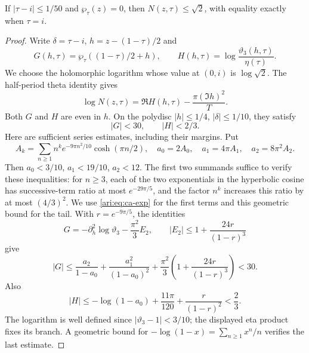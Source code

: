 \begin{proposition}\label{ari:C.8.2}
If $|\tau-i|\le1/50$ and $\wp_\tau(z)=0$, then
$N(z,\tau)\le\sqrt2$, with equality exactly when $\tau=i$.
\end{proposition}
\begin{proof}
Write $\delta=\tau-i$, $h=z-(1-\tau)/2$ and
\[
 G(h,\tau)=\wp_\tau((1-\tau)/2+h),\qquad
 H(h,\tau)=\log\frac{\vartheta_3(h,\tau)}{\eta(\tau)}.
\]
We choose the holomorphic logarithm whose value at $(0,i)$ is
$\log\sqrt2$. The half-period theta identity gives
\begin{equation}\label{ari:eq:ca-H}
 \log N(z,\tau)=\Re H(h,\tau)-\frac{\pi(\Im h)^2}{T}.
\end{equation}
Both $G$ and $H$ are even in $h$. On the polydisc
$|h|\le1/4$, $|\delta|\le1/10$, they satisfy
\begin{equation}\label{ari:eq:ca-GHbounds}
 |G|<30,\qquad |H|<2/3.
\end{equation}
Here are sufficient series estimates, including their margins.
Put
\[
 A_k=\sum_{n\ge1}n^k e^{-9\pi n^2/10}\cosh(\pi n/2),
 \quad a_0=2A_0,\quad a_1=4\pi A_1,\quad a_2=8\pi^2A_2.
\]
Then $a_0<3/10$, $a_1<19/10$, $a_2<12$.
The first two summands suffice to verify these inequalities: for
$n\ge3$, each of the two exponentials in the hyperbolic cosine
has successive-term ratio at most $e^{-29\pi/5}$, and the
factor $n^k$ increases this ratio by at most $(4/3)^2$.
We use \eqref{ari:eq:ca-exp} for the first terms and this geometric
bound for the tail. With $r=e^{-9\pi/5}$, the identities
\[
 G=-\partial_h^2\log\vartheta_3-\frac{\pi^2}{3}E_2,
 \qquad
 |E_2|\le1+\frac{24r}{(1-r)^3}
\]
give
\[
 |G|\le\frac{a_2}{1-a_0}+\frac{a_1^2}{(1-a_0)^2}
       +\frac{\pi^2}{3}\left(1+\frac{24r}{(1-r)^3}\right)<30.
\]
Also
\[
 |H|\le-\log(1-a_0)+\frac{11\pi}{120}
                    +\frac{r}{(1-r)^2}<\frac23.
\]
The logarithm is well defined since $|\vartheta_3-1|<3/10$;
the displayed eta product fixes its branch. A geometric bound
for $-\log(1-x)=\sum_{n\ge1}x^n/n$ verifies the last estimate.


\end{proof}
